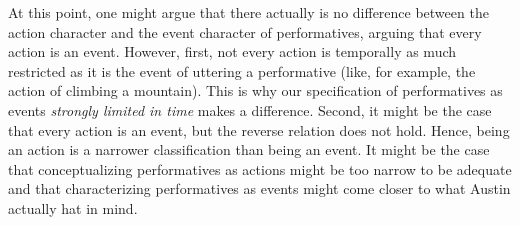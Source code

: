 \documentclass[egregdoesnotlikesansseriftitles,12pt]{scrartcl}
\begin{document}
At this point, one might argue that there actually is no difference between the action character and the event character of performatives, arguing that every action is an event. However, first, not every action is temporally as much restricted as it is the event of uttering a performative (like, for example, the action of climbing a mountain). This is why our specification of performatives as events \textit{strongly limited in time} makes a difference. Second, it might be the case that every action is an event, but the reverse relation does not hold. Hence, being an action is a narrower classification than being an event. It might be the case that conceptualizing performatives as actions might be too narrow to be adequate and that characterizing performatives as events might come closer to what Austin actually hat in mind. 


\end{document}
